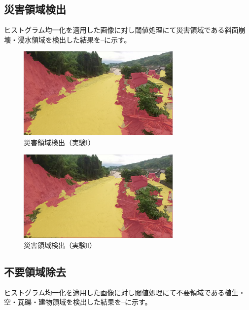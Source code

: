 \documentclass[../Thesis]{subfiles}
\begin{document}
\subsection{災害領域検出}
\label{detection}
ヒストグラム均一化を適用した画像に対し閾値処理にて災害領域である斜面崩壊・浸水領域を検出した結果を--に示す。

\begin{figure}[h]
	\centering
	\includegraphics[width=8cm]{img/detection1.png}
	\caption{災害領域検出（実験Ⅰ）}
	\label{img07}
\end{figure}
\begin{figure}[h]
	\centering
	\includegraphics[width=8cm]{img/detection1.png}
	\caption{災害領域検出（実験Ⅱ）}
	\label{img08}
\end{figure}


\subsection{不要領域除去}
\label{rejection}
ヒストグラム均一化を適用した画像に対し閾値処理にて不要領域である植生・空・瓦礫・建物領域を検出した結果を--に示す。
\end{document}

